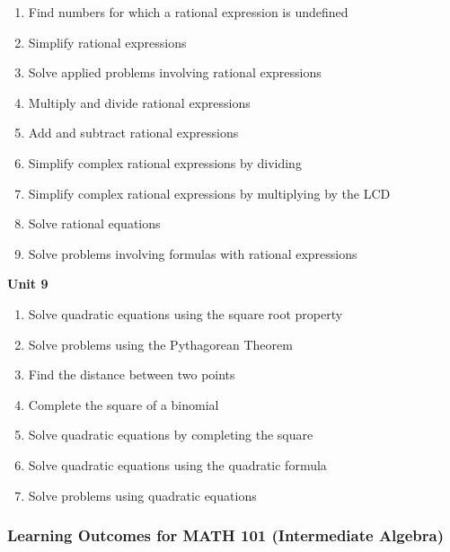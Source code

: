 \documentclass[11pt]{article}
\newenvironment{alphalist}{
\begin{enumerate}[label=(\arabic*),widest=107 ,leftmargin=25pt, itemsep=0pt]}
{\end{enumerate}}
\begin{document}
 \begin{alphalist}
    \item Find numbers for which a rational expression is undefined
    \item Simplify rational expressions
    \item Solve applied problems involving rational expressions
    \item Multiply and divide rational expressions
    \item Add and subtract rational expressions
    \item Simplify complex rational expressions by dividing
    \item Simplify complex rational expressions by multiplying by the LCD
    \item Solve rational equations
    \item Solve problems involving formulas with rational expressions
 \end{alphalist}
\noindent \textbf{Unit 9}
 \begin{alphalist}
    \item Solve quadratic equations using the square root property
    \item Solve problems using the Pythagorean Theorem
    \item Find the distance between two points
    \item Complete the square of a binomial
    \item Solve quadratic equations by completing the square
    \item Solve quadratic equations using the quadratic formula
    \item Solve problems using quadratic equations
 \end{alphalist}

\subsubsection*{Learning Outcomes for MATH 101 (Intermediate Algebra)}
\end{document}

